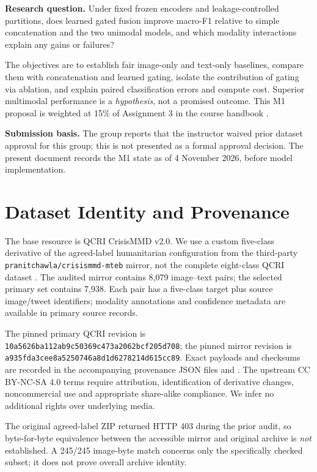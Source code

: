 \documentclass[11pt,a4paper]{article}
\begin{document}
\textbf{Research question.} Under fixed frozen encoders and leakage-controlled partitions, does learned gated fusion improve macro-F1 relative to simple concatenation and the two unimodal models, and which modality interactions explain any gains or failures?

The objectives are to establish fair image-only and text-only baselines, compare them with concatenation and learned gating, isolate the contribution of gating via ablation, and explain paired classification errors and compute cost. Superior multimodal performance is a \emph{hypothesis}, not a promised outcome. This M1 proposal is weighted at 15\% of Assignment 3 in the course handbook \cite{handbook2026}.

\textbf{Submission basis.} The group reports that the instructor waived prior dataset approval for this group; this is not presented as a formal approval decision. The present document records the M1 state as of 4 November 2026, before model implementation.

\section{Dataset Identity and Provenance}
The base resource is QCRI CrisisMMD v2.0. We use a custom five-class derivative of the agreed-label humanitarian configuration from the third-party \texttt{pranitchawla/crisismmd-mteb} mirror, not the complete eight-class QCRI dataset \cite{qcri,mirror}. The audited mirror contains 8,079 image--text pairs; the selected primary set contains 7,938. Each pair has a five-class target plus source image/tweet identifiers; modality annotations and confidence metadata are available in primary source records.

The pinned primary QCRI revision is \texttt{10a5626ba112ab9c50369c473a2062bcf205d708}; the pinned mirror revision is \texttt{a935fda3cee8a5250746a8d1d6278214d615cc89}. Exact payloads and checksums are recorded in the accompanying provenance JSON files and . The upstream CC BY-NC-SA 4.0 terms require attribution, identification of derivative changes, noncommercial use and appropriate share-alike compliance. We infer no additional rights over underlying media.

The original agreed-label ZIP returned HTTP 403 during the prior audit, so byte-for-byte equivalence between the accessible mirror and original archive is \emph{not} established. A 245/245 image-byte match concerns only the specifically checked subset; it does not prove overall archive identity.
\end{document}
